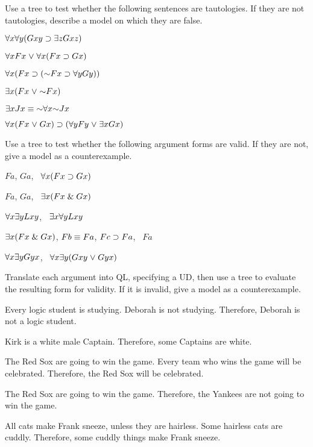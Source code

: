 \solutions
\problempart
\label{pr.QL.trees.tautology}
Use a tree to test whether the following sentences are tautologies. If they are not tautologies, describe a model on which they are false.
\begin{earg}
\item $\forall x \forall y (Gxy \supset \exists z Gxz)$
\item $\forall x Fx \mkern1mu\vee\mkern1mu \forall x (Fx \supset Gx)$
\item $\qt{\forall}{x} (Fx \eif (\enot Fx \eif \qt{\forall}{y} Gy))$
\item $\qt{\exists}{x} (Fx \eor \enot Fx)$
\item $\qt{\exists}{x} Jx \eiff \enot \qt{\forall}{x} \enot Jx$
\item $\forall x (Fx \mkern1mu\vee\mkern1mu Gx) \supset (\forall y Fy \mkern1mu\vee\mkern1mu \exists x Gx)$
\end{earg}

\solutions
\problempart
\label{pr.QL.trees.validity}
Use a tree to test whether the following argument forms are valid. If they are not, give a model as a counterexample.
\begin{earg}
\item $Fa$, $Ga$, \therefore\ $\forall x (Fx \supset Gx)$
\item $Fa$, $Ga$, \therefore\ $\exists x (Fx \mathrel\& Gx)$
\item $\forall x \exists y Lxy$, \therefore\ $\exists x \forall y Lxy$
\item $\exists x (Fx \mathrel\& Gx)$, $Fb \equiv Fa$, $Fc \supset Fa$, \therefore\ $Fa$
\item $\forall x \exists y Gyx$, \therefore\ $\forall x \exists y (Gxy \mkern1mu\vee\mkern1mu Gyx)$
\end{earg}

\problempart
\label{pr.QL.trees.translation.and.validity}
Translate each argument into QL, specifying a UD, then use a tree to evaluate the resulting form for validity. If it is invalid, give a model as a counterexample.
\begin{earg}
\item Every logic student is studying. Deborah is not studying. Therefore, Deborah is not a logic student.
\item Kirk is a white male Captain. Therefore, some Captains are white.
\item The Red Sox are going to win the game. Every team who wins the game will be celebrated. Therefore, the Red Sox will be celebrated.
\item The Red Sox are going to win the game. Therefore, the Yankees are not going to win the game.
\item All cats make Frank sneeze, unless they are hairless. Some hairless cats are cuddly. Therefore, some cuddly things make Frank sneeze.
\end{earg}

\fi
